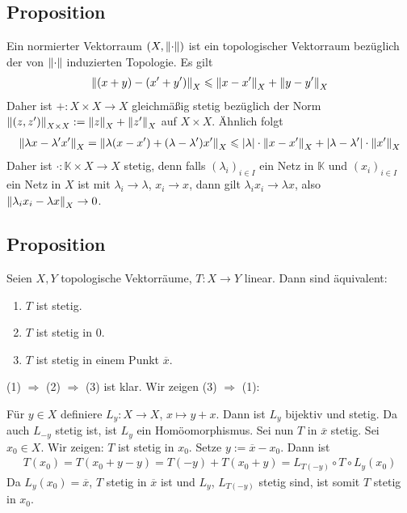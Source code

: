 \subsection[Proposition: Normierte Vektorräume sind topologische Vektorräume]{Proposition} %
\label{sub:23}
Ein normierter Vektorraum $(X, \norm{\cdot})$ ist ein topologischer Vektorraum bezüglich der von $\norm{\cdot}$ induzierten Topologie.
Es gilt 
\begin{align*}
	\norm[X]{(x+y) - (x'+y')} \le \norm[X]{x-x'} + \norm[X]{y-y'}   
\end{align*}
Daher ist $+ \colon X \times X \to X$ gleichmäßig stetig bezüglich der Norm $\norm[X \times X]{(z,z')} := \norm[X]{z} + \norm[X]{z'}$ auf $X \times X$. Ähnlich folgt
\begin{align*}
	\norm[X]{\lambda x - \lambda' x'} = \norm[X]{\lambda (x-x') + (\lambda -\lambda')x'} \le \abs*{\lambda } \cdot \norm[X]{x-x'} + \abs*{\lambda -\lambda'} \cdot 
	\norm[X]{x'}      
\end{align*}
Daher ist $\cdot \colon \mathds{K} \times X \to X$ stetig, denn falls $(\lambda_i)_{i \in I}$ ein Netz in $\mathds{K}$ und $(x_i)_{i \in I}$ ein Netz in $X$ ist mit 
$\lambda_i \to \lambda $, $x_i\to x$, dann  gilt $\lambda_i x_i \to \lambda x$, also $\norm[X]{\lambda_i x_i - \lambda x} \to 0$. \bewende

\subsection[Proposition: Stetigkeit einer linearen Abbildung zwischen topologischen Vektorräumen]{Proposition} %
\label{sub:24}
Seien $X,Y$ topologische Vektorräume, $T : X \to Y$ linear. Dann sind äquivalent:
\begin{enumerate}[(1)]
	\item $T$ ist stetig.
	\item $T$ ist stetig in $0$.
	\item $T$ ist stetig in einem Punkt $\overline{x}$.
\end{enumerate}
(1) $\Rightarrow$ (2) $\Rightarrow $ (3) ist klar. Wir zeigen (3) $\Rightarrow$ (1):

Für $y \in X$ definiere $L_y \colon X \to X$, $x \mapsto y+ x$. Dann ist $L_y$ bijektiv und stetig. Da auch $L_{-y}$ stetig ist, ist $L_y$ ein Homöomorphismus. Sei nun $T$ in 
$\overline{x}$ stetig. Sei $x_0 \in X$. Wir zeigen: $T$ ist stetig in $x_0$. Setze $y := \overline{x} - x_0$. Dann ist
\begin{align*}
	T(x_0) = T(x_0+y-y) = T(-y) + T(x_0+y) = L_{T(-y)} \circ T \circ L_y (x_0)
\end{align*}
Da $L_y(x_0) = \overline{x}$, $T$ stetig in $\overline{x}$ ist und $L_y$, $L_{T(-y)}$ stetig sind, ist somit $T$ stetig in $x_0$. \bewende

